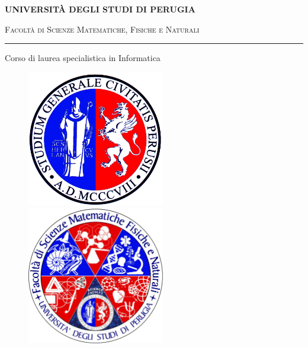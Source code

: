 \begin{titlepage}
    \begin{center}
        \textbf{\Large UNIVERSIT\`{A} DEGLI STUDI DI PERUGIA}
        \vspace{0.5cm}
        
        {\scshape Facoltà di Scienze Matematiche, Fisiche e Naturali}
        
        \vspace{0.5cm}
        
        \rule[1mm]{\textwidth}{0.2mm}
        
        \vspace{1cm}
        
        \begin{Large}Corso di laurea specialistica in {Informatica}\end{Large}
        
        \vspace{0.5cm}
        
        \begin{figure}[htbp] 
            \begin{center} 
                \includegraphics[width=6cm]{immagini/logo_unipg.jpg}
                \includegraphics[width=6cm]{immagini/logo_scienze_unipg.jpg}
            \end{center} 
        \end{figure}
        

\end{center}
\end{titlepage}
